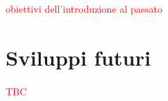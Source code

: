 \textcolor{red}{obiettivi dell'introduzione al passato}

\section{Sviluppi futuri}

\textcolor{red}{TBC}
